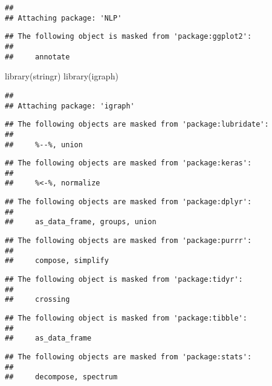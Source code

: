 \documentclass[
]{article}
\newenvironment{Shaded}{\begin{snugshade}}{\end{snugshade}}
\newcommand{\FunctionTok}[1]{\textcolor[rgb]{0.00,0.00,0.00}{#1}}
\newcommand{\NormalTok}[1]{#1}
\begin{document}
\begin{verbatim}
## 
## Attaching package: 'NLP'
\end{verbatim}

\begin{verbatim}
## The following object is masked from 'package:ggplot2':
## 
##     annotate
\end{verbatim}

\begin{Shaded}
\begin{Highlighting}[]
\FunctionTok{library}\NormalTok{(stringr)}
\FunctionTok{library}\NormalTok{(igraph)}
\end{Highlighting}
\end{Shaded}

\begin{verbatim}
## 
## Attaching package: 'igraph'
\end{verbatim}

\begin{verbatim}
## The following objects are masked from 'package:lubridate':
## 
##     %--%, union
\end{verbatim}

\begin{verbatim}
## The following objects are masked from 'package:keras':
## 
##     %<-%, normalize
\end{verbatim}

\begin{verbatim}
## The following objects are masked from 'package:dplyr':
## 
##     as_data_frame, groups, union
\end{verbatim}

\begin{verbatim}
## The following objects are masked from 'package:purrr':
## 
##     compose, simplify
\end{verbatim}

\begin{verbatim}
## The following object is masked from 'package:tidyr':
## 
##     crossing
\end{verbatim}

\begin{verbatim}
## The following object is masked from 'package:tibble':
## 
##     as_data_frame
\end{verbatim}

\begin{verbatim}
## The following objects are masked from 'package:stats':
## 
##     decompose, spectrum
\end{verbatim}
\end{document}
